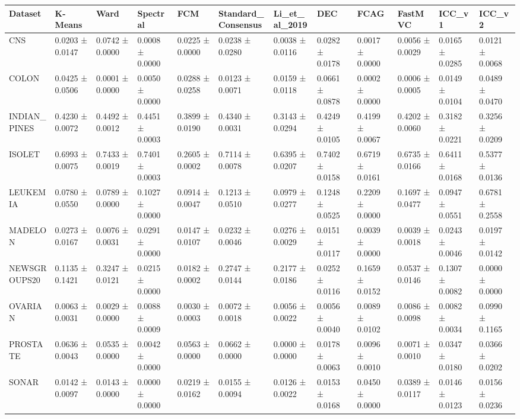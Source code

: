 \begin{tabular}{llllllllllll}
\toprule
Dataset & K-Means & Ward & Spectral & FCM & Standard_Consensus & Li_et_al_2019 & DEC & FCAG & FastMVC & ICC_v1 & ICC_v2 \\
\midrule
CNS & 0.0203 ± 0.0147 & 0.0742 ± 0.0000 & 0.0008 ± 0.0000 & 0.0225 ± 0.0000 & 0.0238 ± 0.0280 & 0.0038 ± 0.0116 & 0.0282 ± 0.0178 & 0.0017 ± 0.0000 & 0.0056 ± 0.0029 & 0.0165 ± 0.0285 & 0.0121 ± 0.0068 \\
COLON & 0.0425 ± 0.0506 & 0.0001 ± 0.0000 & 0.0050 ± 0.0000 & 0.0288 ± 0.0258 & 0.0123 ± 0.0071 & 0.0159 ± 0.0118 & 0.0661 ± 0.0878 & 0.0002 ± 0.0000 & 0.0006 ± 0.0005 & 0.0149 ± 0.0104 & 0.0489 ± 0.0470 \\
INDIAN_PINES & 0.4230 ± 0.0072 & 0.4492 ± 0.0012 & 0.4451 ± 0.0003 & 0.3899 ± 0.0190 & 0.4340 ± 0.0031 & 0.3143 ± 0.0294 & 0.4249 ± 0.0105 & 0.4199 ± 0.0067 & 0.4202 ± 0.0060 & 0.3182 ± 0.0221 & 0.3256 ± 0.0209 \\
ISOLET & 0.6993 ± 0.0075 & 0.7433 ± 0.0019 & 0.7401 ± 0.0003 & 0.2605 ± 0.0002 & 0.7114 ± 0.0078 & 0.6395 ± 0.0207 & 0.7402 ± 0.0158 & 0.6719 ± 0.0161 & 0.6735 ± 0.0166 & 0.6411 ± 0.0168 & 0.5377 ± 0.0136 \\
LEUKEMIA & 0.0780 ± 0.0550 & 0.0789 ± 0.0000 & 0.1027 ± 0.0000 & 0.0914 ± 0.0047 & 0.1213 ± 0.0510 & 0.0979 ± 0.0277 & 0.1248 ± 0.0525 & 0.2209 ± 0.0000 & 0.1697 ± 0.0477 & 0.0947 ± 0.0551 & 0.6781 ± 0.2558 \\
MADELON & 0.0273 ± 0.0167 & 0.0076 ± 0.0031 & 0.0291 ± 0.0000 & 0.0147 ± 0.0107 & 0.0232 ± 0.0046 & 0.0276 ± 0.0029 & 0.0151 ± 0.0117 & 0.0039 ± 0.0000 & 0.0039 ± 0.0018 & 0.0243 ± 0.0046 & 0.0197 ± 0.0142 \\
NEWSGROUPS20 & 0.1135 ± 0.1421 & 0.3247 ± 0.0121 & 0.0215 ± 0.0000 & 0.0182 ± 0.0002 & 0.2747 ± 0.0144 & 0.2177 ± 0.0186 & 0.0252 ± 0.0116 & 0.1659 ± 0.0152 & 0.0537 ± 0.0146 & 0.1307 ± 0.0082 & 0.0000 ± 0.0000 \\
OVARIAN & 0.0063 ± 0.0031 & 0.0029 ± 0.0000 & 0.0088 ± 0.0009 & 0.0030 ± 0.0003 & 0.0072 ± 0.0018 & 0.0056 ± 0.0022 & 0.0056 ± 0.0040 & 0.0089 ± 0.0102 & 0.0086 ± 0.0098 & 0.0082 ± 0.0034 & 0.0990 ± 0.1165 \\
PROSTATE & 0.0636 ± 0.0043 & 0.0535 ± 0.0000 & 0.0042 ± 0.0000 & 0.0563 ± 0.0000 & 0.0662 ± 0.0000 & 0.0000 ± 0.0000 & 0.0178 ± 0.0063 & 0.0096 ± 0.0010 & 0.0071 ± 0.0010 & 0.0347 ± 0.0180 & 0.0366 ± 0.0202 \\
SONAR & 0.0142 ± 0.0097 & 0.0143 ± 0.0000 & 0.0000 ± 0.0000 & 0.0219 ± 0.0162 & 0.0155 ± 0.0094 & 0.0126 ± 0.0022 & 0.0153 ± 0.0168 & 0.0450 ± 0.0000 & 0.0389 ± 0.0117 & 0.0146 ± 0.0123 & 0.0156 ± 0.0236 \\

\end{tabular}
